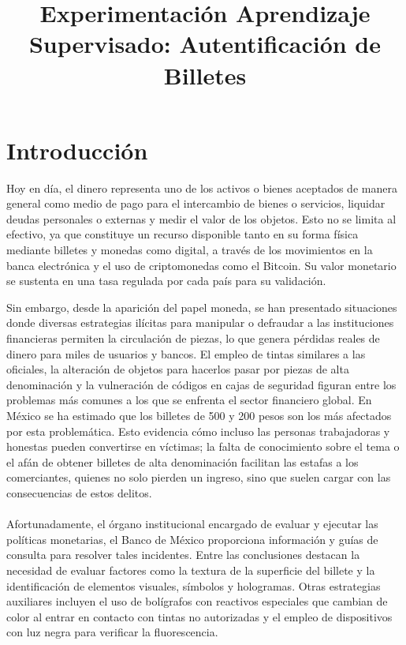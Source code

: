 \documentclass[conference]{IEEEtran}
\title{Experimentación Aprendizaje Supervisado: Autentificación de Billetes }
\author{
	\IEEEauthorblockN{Leonardo Daniel Aviña Neri}
	\IEEEauthorblockA{
		\texttt{ld.avinaneri@ugto.mx}
	}
	\and
	\IEEEauthorblockN{Diana Laura Garcia Zavala}
	\IEEEauthorblockA{
		\texttt{dl.garcia.zavala@ugto.mx}
	}
	\and
	\IEEEauthorblockN{Jonathan Omar Villafaña Razo}
	\IEEEauthorblockA{
		\texttt{jo.villafanarazo@ugto.mx}
	}
	\and
	\IEEEauthorblockN{Alejandro Reynoso Flores}
	\IEEEauthorblockA{
		\texttt{a.reynosoflores@ugto.mx}
	}
	\and
	\IEEEauthorblockN{Ademar Antonio De Leon Vazquez}
	\IEEEauthorblockA{
	\texttt{a.reynosoflores@ugto.mx
	}
	}
	\and
	\IEEEauthorblockN{Emmanuel Vargas Cisneros}
	\IEEEauthorblockA{
		\texttt{e.vargascisneros@ugto.mx}
	}
}
\begin{document}
	\maketitle
	
	\begin{abstract}
	\end{abstract}
	
	\begin{IEEEkeywords}
		
	\end{IEEEkeywords}
	
	\section{Introducción}
	Hoy en día, el dinero representa uno de los activos o bienes aceptados de manera general como medio de pago para el intercambio de bienes o servicios, liquidar deudas personales o externas y medir el valor de los objetos. Esto no se limita al efectivo, ya que constituye un recurso disponible tanto en su forma física mediante billetes y monedas como digital, a través de los movimientos en la banca electrónica y el uso de criptomonedas como el Bitcoin. Su valor monetario se sustenta en una tasa regulada por cada país para su validación. 
	
	Sin embargo, desde la aparición del papel moneda, se han presentado situaciones donde diversas estrategias ilícitas para manipular o defraudar a las instituciones financieras permiten la circulación de piezas, lo que genera pérdidas reales de dinero para miles de usuarios y bancos. El empleo de tintas similares a las oficiales, la alteración de objetos para hacerlos pasar por piezas de alta denominación y la vulneración de códigos en cajas de seguridad figuran entre los problemas más comunes a los que se enfrenta el sector financiero global.
	En México se ha estimado que los billetes de 500 y 200 pesos son los más afectados por esta problemática. Esto evidencia cómo incluso las personas trabajadoras y honestas pueden convertirse en víctimas; la falta de conocimiento sobre el tema o el afán de obtener billetes de alta denominación facilitan las estafas a los comerciantes, quienes no solo pierden un ingreso, sino que suelen cargar con las consecuencias de estos delitos.
	\\\\
	Afortunadamente, el órgano institucional encargado de evaluar y ejecutar las políticas monetarias, el Banco de México proporciona información y guías de consulta para resolver tales incidentes. Entre las conclusiones destacan la necesidad de evaluar factores como la textura de la superficie del billete y la identificación de elementos visuales, símbolos y hologramas. Otras estrategias auxiliares incluyen el uso de bolígrafos con reactivos especiales que cambian de color al entrar en contacto con tintas no autorizadas y el empleo de dispositivos con luz negra para verificar la fluorescencia.
	
\end{document}
